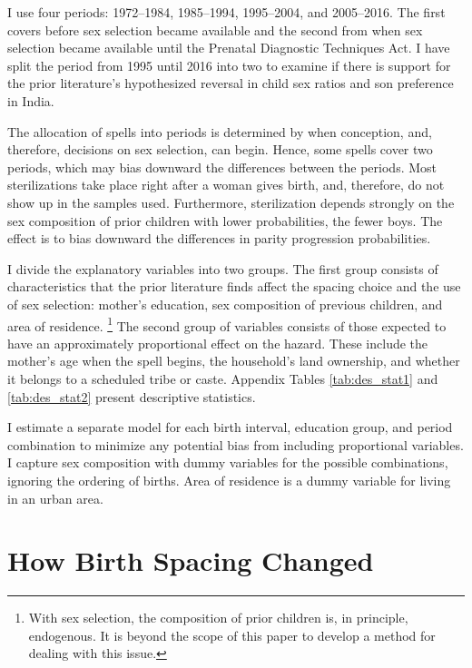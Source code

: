 \documentclass[12pt,letterpaper]{article}
\begin{document}
I use four periods: 1972--1984, 1985--1994, 1995--2004, and 2005--2016.
The first covers before sex selection became available and the second from when sex 
selection became available until the Prenatal Diagnostic Techniques Act.
I have split the period from 1995 until 2016 into two to examine if there is support for 
the prior literature's hypothesized reversal in child sex ratios and son 
preference in India.

The allocation of spells into periods is determined by when conception, and, therefore, 
decisions on sex selection, can begin. 
Hence, some spells cover two periods, which may bias downward the differences between the 
periods.
Most sterilizations take place right after a woman gives birth, and,
therefore, do not show up in the samples used. 
Furthermore, sterilization depends strongly on the sex composition of prior children
with lower probabilities, the fewer boys. 
The effect is to bias downward the differences in parity progression probabilities.

I divide the explanatory variables into two groups.
The first group consists of characteristics that the prior literature finds affect 
the spacing choice and the use of sex selection:
mother's education, sex composition of previous children, and area of residence.%
\footnote{
With sex selection, the composition of prior children is, in principle, endogenous.
It is beyond the scope of this paper to develop a method for dealing with this issue.
}
The second group of variables consists of those expected to have an approximately 
proportional effect on the hazard.
These include the mother's age when the spell begins, the household's
land ownership, and whether it belongs to a scheduled tribe or caste.
Appendix Tables \ref{tab:des_stat1} and \ref{tab:des_stat2} present descriptive statistics.

I estimate a separate model for each birth interval, education group, and period 
combination to minimize any potential bias from including proportional variables.
I capture sex composition with dummy variables for the
possible combinations, ignoring the ordering of births.
Area of residence is a dummy variable for living in an urban area.


\section{How Birth Spacing Changed\label{sec:results}}
\end{document}

